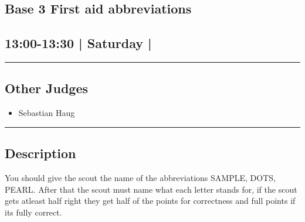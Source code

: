 \documentclass[10pt, A5]{article}
\begin{document}
		\begin{framed}
			\begin{minipage}{\textwidth}

			\setcounter{section}{30}
							\section{\faStar \: Base 3 \faStar \: First aid abbreviations}
						
			\subsection*{13:00-13:30 | Saturday | }

			\vspace{0.25cm}
			\hrule
			\vspace{0.25cm}


			\subsection*{Other Judges}
							

				\begin{multicols}{2}

			\begin{itemize}
											\item Sebastian Haug
								\end{itemize}

			\vfill\null
			\columnbreak

			\begin{itemize}
								\end{itemize}

			\vfill\null

			\end{multicols}

			\vspace{0.25cm}
			\hrule
			\vspace{0.25cm}

			\begin{minipage}{\textwidth}
			\subsection*{\faListAlt \: Description}
			You should give the scout the name of the abbreviations SAMPLE, DOTS, PEARL. After that the scout must name what each letter stands for, if the scout gets atleast half right they get half of the points for correctness and full points if its fully correct.
			\end{minipage}


	\end{minipage}
	\end{framed}
\end{document}
